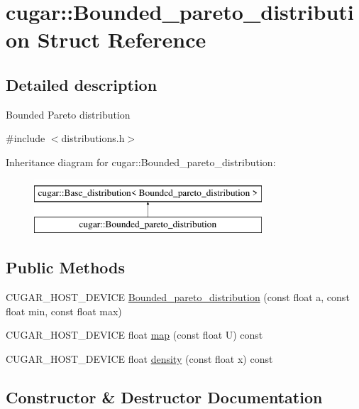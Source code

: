 \hypertarget{structcugar_1_1_bounded__pareto__distribution}{}\section{cugar\+:\+:Bounded\+\_\+pareto\+\_\+distribution Struct Reference}
\label{structcugar_1_1_bounded__pareto__distribution}


\subsection{Detailed description}
Bounded Pareto distribution 

{\ttfamily \#include $<$distributions.\+h$>$}

Inheritance diagram for cugar\+:\+:Bounded\+\_\+pareto\+\_\+distribution\+:\begin{figure}[H]
\begin{center}
\leavevmode
\includegraphics[height=2.000000cm]{structcugar_1_1_bounded__pareto__distribution}
\end{center}
\end{figure}
\subsection*{Public Methods}
\begin{DoxyCompactItemize}
\item 
C\+U\+G\+A\+R\+\_\+\+H\+O\+S\+T\+\_\+\+D\+E\+V\+I\+CE \hyperlink{structcugar_1_1_bounded__pareto__distribution_aeaecb7792cf38321287e71626fab3cb7}{Bounded\+\_\+pareto\+\_\+distribution} (const float a, const float min, const float max)
\item 
C\+U\+G\+A\+R\+\_\+\+H\+O\+S\+T\+\_\+\+D\+E\+V\+I\+CE float \hyperlink{structcugar_1_1_bounded__pareto__distribution_a91ec0f08a9d9355ec67bd176f34a1a6c}{map} (const float U) const
\item 
C\+U\+G\+A\+R\+\_\+\+H\+O\+S\+T\+\_\+\+D\+E\+V\+I\+CE float \hyperlink{structcugar_1_1_bounded__pareto__distribution_a5f909b164a22aeae3e58b9c73571f599}{density} (const float x) const
\end{DoxyCompactItemize}


\subsection{Constructor \& Destructor Documentation}
\mbox{\label{structcugar_1_1_bounded__pareto__distribution_aeaecb7792cf38321287e71626fab3cb7}} 
